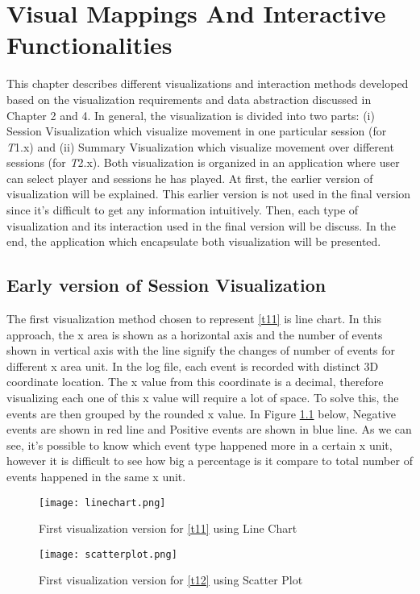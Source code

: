\chapter{Visual Mappings And Interactive Functionalities}
This chapter describes different visualizations and interaction methods developed based on the visualization requirements and data abstraction discussed in Chapter 2 and 4. In general, the visualization is divided into two parts: (i) Session Visualization which visualize movement in one particular session (for \textit{T}1.x) and (ii) Summary Visualization which visualize movement over different sessions (for \textit{T}2.x). Both visualization is organized in an application where user can select player and sessions he has played. At first, the earlier version of visualization will be explained. This earlier version is not used in the final version since it's difficult to get any information intuitively. Then, each type of visualization and its interaction used in the final version will be discuss. In the end, the application which encapsulate both visualization will be presented.

\section{Early version of Session Visualization}
The first visualization method chosen to represent \ref{t11} is line chart. In this approach, the x area is shown as a horizontal axis and the number of events shown in vertical axis with the line signify the changes of number of events for different x area unit. In the log file, each event is recorded with distinct 3D coordinate location. The x value from this coordinate is a decimal, therefore visualizing each one of this x value will require a lot of space. To solve this, the events are then grouped by the rounded x value. In Figure \ref{first_linechart} below, Negative events are shown in red line and Positive events are shown in blue line. As we can see, it's possible to know which event type happened more in a certain x unit, however it is difficult to see how big a percentage is it compare to total number of events happened in the same x unit.

\begin{figure}
\centering
\texttt{[image: linechart.png]}
\caption{First visualization version for \ref{t11} using Line Chart}
\label{first_linechart}
\end{figure}

\begin{figure}
\centering
\texttt{[image: scatterplot.png]}
\caption{First visualization version for \ref{t12} using Scatter Plot}
\label{first_scatterplot}
\end{figure}

